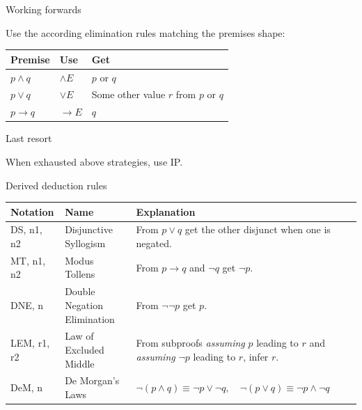 \documentclass{article}
\begin{document}
\begin{theorem}
    {Working forwards}

    Use the according elimination rules matching the premises shape:

    \begin{tabular}{l|l|l}
        \textbf{Premise}  & \textbf{Use}    & \textbf{Get}                         \\
        \hline
        $p \land q$       & $\land E$       & $p$ or $q$                           \\
        $p \lor q$        & $\lor E$        & Some other value $r$ from $p$ or $q$ \\
        $p \rightarrow q$ & $\rightarrow E$ & $q$                                  \\
    \end{tabular}
\end{theorem}

\begin{theorem}
    {Last resort}

    When exhausted above strategies, use IP.
\end{theorem}

\begin{definition}
    {Derived deduction rules}
    \begin{tabular}{l|lp{8cm}}
        \hline
        \textbf{Notation} & \textbf{Name}               & \textbf{Explanation}                                                                                          \\
        \hline
        DS, n1, n2        & Disjunctive Syllogism       & From $p \lor q$ get the other disjunct when one is negated.                                                   \\
        MT, n1, n2        & Modus Tollens               & From $p \rightarrow q$ and $\neg q$ get $\neg p$.                                                             \\
        DNE, n            & Double Negation Elimination & From $\neg \neg p$ get $p$.                                                                                   \\
        LEM, r1, r2       & Law of Excluded Middle      & From subproofs \textit{assuming} $p$ leading to $r$ and \textit{assuming} $\neg p$ leading to $r$, infer $r$. \\
        DeM, n            & De Morgan's Laws            & $\neg(p \land q) \equiv \neg p \lor \neg q,\quad \neg(p \lor q) \equiv \neg p \land \neg q$                   \\
    \end{tabular}
\end{definition}
\end{document}
